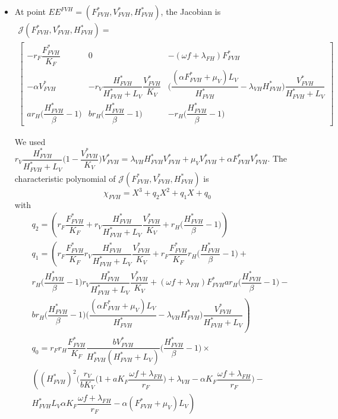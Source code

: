 \documentclass{article}
\newcommand{\lf}{\lambda_{FH}}
\newcommand{\lv}{\lambda_{VH}}
\newcommand{\FHterme}{\omega f + \lf}
\begin{document}
\begin{itemize}
\item At point $EE^{FVH} = (F^*_{FVH}, V^*_{FVH},H^*_{FVH})$, the Jacobian is 
\begin{multline}
\mathcal{J}(F^*_{FVH}, V^*_{FVH}, H^*_{FVH}) = \\
\begin{bmatrix}
-r_F \dfrac{F^*_{FVH}}{K_F} &0 &-(\FHterme) F^*_{FVH} \\
-\alpha V^*_{FVH} & -r_V \dfrac{H^*_{FVH}}{H^*_{FVH} + L_V}\dfrac{V^*_{FVH}}{K_V} & \Big(\dfrac{(\alpha F^*_{FVH} + \mu_V)L_V}{H^*_{FVH}} - \lv H^*_{FVH} \Big)\dfrac{V^*_{FVH}}{H^*_{FVH}+L_V} \\
a r_H \Big(\dfrac{H^*_{FVH}}{\beta} - 1\Big) & b r_H \Big(\dfrac{H^*_{FVH}}{\beta} - 1\Big) & -r_H\Big(\dfrac{H^*_{FVH}}{\beta} - 1\Big)
\end{bmatrix}
\end{multline}

We used $r_V \dfrac{H^*_{FVH}}{H^*_{FVH} + L_V} \Big(1 - \dfrac{V^*_{FVH}}{K_V} \Big)V^*_{FVH} = \lv H^*_{FVH} V^*_{FVH} + \mu_VV^*_{FVH} + \alpha F^*_{FVH}V^*_{FVH} $.
The characteristic polynomial of $\mathcal{J}(F^*_{FVH}, V^*_{FVH}, H^*_{FVH})$ is 
\begin{equation}
\chi_{FVH} = X^3 + q_2X^2 + q_1 X + q_0
\end{equation}
with 
\begin{subequations}
\begin{align}
&q_2 = \left(r_F \dfrac{F^*_{FVH}}{K_F} + r_V \dfrac{H^*_{FVH}}{H^*_{FVH} + L_V}\dfrac{V^*_{FVH}}{K_V} + r_H\Big(\dfrac{H^*_{FVH}}{\beta} - 1\Big) \right)\\
&q_1 = \left(r_F \dfrac{F^*_{FVH}}{K_F}r_V \dfrac{H^*_{FVH}}{H^*_{FVH} + L_V}\dfrac{V^*_{FVH}}{K_V} +r_F \dfrac{F^*_{FVH}}{K_F} r_H\Big(\dfrac{H^*_{FVH}}{\beta} - 1\Big) + \right. \\ \nonumber &\left. r_H\Big(\dfrac{H^*_{FVH}}{\beta} - 1\Big)r_V \dfrac{H^*_{FVH}}{H^*_{FVH} + L_V}\dfrac{V^*_{FVH}}{K_V} + (\FHterme) F^*_{FVH}a r_H \Big(\dfrac{H^*_{FVH}}{\beta} - 1\Big) - \right. \\ \nonumber &\left. b r_H \Big(\dfrac{H^*_{FVH}}{\beta} - 1\Big)\Big(\dfrac{(\alpha F^*_{FVH} + \mu_V)L_V}{H^*_{FVH}} - \lv H^*_{FVH} \Big)\dfrac{V^*_{FVH}}{H^*_{FVH}+L_V} \right) \\
&q_0 = r_F r_H \dfrac{F^*_{FVH}}{K_F} \dfrac{bV^*_{FVH}}{H^*_{FVH}(H^*_{FVH}+L_V)}\Big(\dfrac{H^*_{FVH}}{\beta}-1\Big) \times \\ \nonumber
&\left( (H^*_{FVH})^2 \Big(\dfrac{r_V}{bK_V}\Big( 1 + aK_F \dfrac{\FHterme}{r_F} \Big)+ \lv - \alpha K_F \dfrac{\FHterme}{r_F} \Big) - 
\right. \\ \nonumber & \left.
H^*_{FVH} L_V \alpha K_F \dfrac{\FHterme}{r_F} - \alpha (F^*_{FVH} +\mu_V)L_V \right)
\end{align}
\end{subequations}


\end{itemize}
\end{document}
